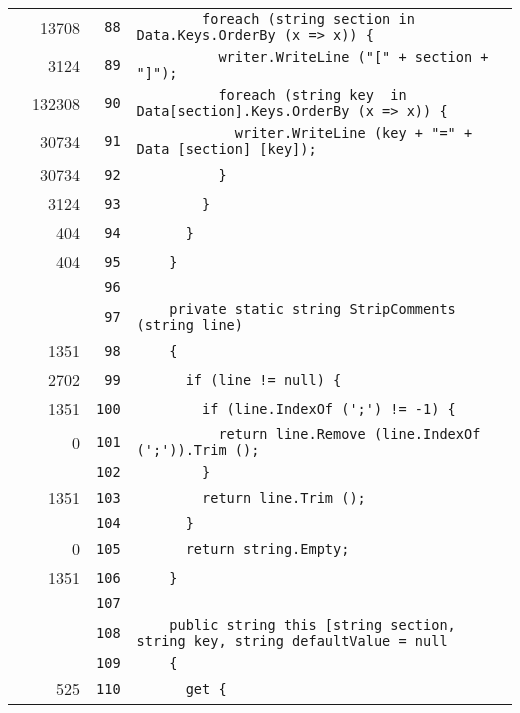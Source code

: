\documentclass[a4paper,10pt]{article}
\begin{document}
\begin{longtable}[l]{lrrl}
\cellcolor{green} & 13708 & \verb~88~ & \verb~        foreach (string section in Data.Keys.OrderBy (x => x)) {~\\
\cellcolor{green} & 3124 & \verb~89~ & \verb~          writer.WriteLine ("[" + section + "]");~\\
\cellcolor{green} & 132308 & \verb~90~ & \verb~          foreach (string key  in Data[section].Keys.OrderBy (x => x)) {~\\
\cellcolor{green} & 30734 & \verb~91~ & \verb~            writer.WriteLine (key + "=" + Data [section] [key]);~\\
\cellcolor{green} & 30734 & \verb~92~ & \verb~          }~\\
\cellcolor{green} & 3124 & \verb~93~ & \verb~        }~\\
\cellcolor{green} & 404 & \verb~94~ & \verb~      }~\\
\cellcolor{green} & 404 & \verb~95~ & \verb~    }~\\
\cellcolor{gray} &  & \verb~96~ & \verb~~\\
\cellcolor{gray} &  & \verb~97~ & \verb~    private static string StripComments (string line)~\\
\cellcolor{green} & 1351 & \verb~98~ & \verb~    {~\\
\cellcolor{green} & 2702 & \verb~99~ & \verb~      if (line != null) {~\\
\cellcolor{green} & 1351 & \verb~100~ & \verb~        if (line.IndexOf (';') != -1) {~\\
\cellcolor{red} & 0 & \verb~101~ & \verb~          return line.Remove (line.IndexOf (';')).Trim ();~\\
\cellcolor{gray} &  & \verb~102~ & \verb~        }~\\
\cellcolor{green} & 1351 & \verb~103~ & \verb~        return line.Trim ();~\\
\cellcolor{gray} &  & \verb~104~ & \verb~      }~\\
\cellcolor{red} & 0 & \verb~105~ & \verb~      return string.Empty;~\\
\cellcolor{green} & 1351 & \verb~106~ & \verb~    }~\\
\cellcolor{gray} &  & \verb~107~ & \verb~~\\
\cellcolor{gray} &  & \verb~108~ & \verb~    public string this [string section, string key, string defaultValue = null~\\
\cellcolor{gray} &  & \verb~109~ & \verb~    {~\\
\cellcolor{green} & 525 & \verb~110~ & \verb~      get {~\\

\end{longtable}
\end{document}
